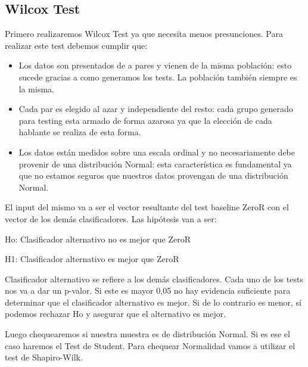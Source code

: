 \subsection{Wilcox Test}

Primero realizaremos Wilcox Test ya que necesita menos presunciones. Para realizar este test debemos cumplir que:

\begin{itemize}
    \item Los datos son presentados de a pares y vienen de la misma población: esto sucede gracias a como generamos los tests. La población también siempre es la misma.
    \item Cada par es elegido al azar y independiente del resto: cada grupo generado para testing esta armado de forma azarosa ya que la elección de cada hablante se realiza de esta forma.
    \item Los datos están medidos sobre una escala ordinal y no necesariamente debe provenir de una distribución Normal: esta característica es fundamental ya que no estamos seguros que nuestros datos provengan de una distribución Normal.
\end{itemize}

El input del mismo va a ser el vector resultante del test baseline ZeroR con el vector de los demás clasificadores. Las hipótesis van a ser:

\vspace{0.5cm}
\hspace{2cm}Ho: Clasificador alternativo no es mejor que ZeroR
\vspace{0.25cm}

\hspace{2cm}H1: Clasificador alternativo es mejor que ZeroR
\vspace{0.5cm}

Clasificador alternativo se refiere a los demás clasificadores. Cada uno de los tests nos va a dar un p-valor. Si este es mayor 0,05 no hay evidencia suficiente para determinar que el clasificador alternativo es mejor. Si de lo contrario es menor, sí podemos rechazar Ho y asegurar que el alternativo es mejor. 

Luego chequearemos si nuestra muestra es de distribución Normal. Si es ese el caso haremos el Test de Student. Para chequear Normalidad vamos a utilizar el test de Shapiro-Wilk.

